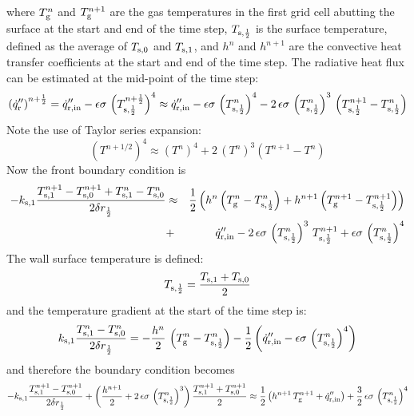 where $T_{\rm g}^n$ and $T_{\rm g}^{n+1}$ are the gas temperatures in the first grid cell abutting the surface at the start and end of the time step, $T_{\rm s,\frac{1}{2}}$ is the surface temperature, defined as the average of $T_{\rm s,0}$ and $T_{\rm s,1}$, and $h^n$ and $h^{n+1}$ are the convective heat transfer coefficients at the start and end of the time step. The radiative heat flux can be estimated at the mid-point of the time step:
\begin{equation}
\label{radi}
\left( \dot{q}_{\rm r}'' \right)^{n+\frac{1}{2}} = \dot{q}_{\rm r, in}'' - \epsilon \sigma \, \left( T_{\rm s,\frac{1}{2}}^{n+\frac{1}{2}} \right)^4
  \approx \dot{q}_{\rm r, in}'' - \epsilon \sigma \, \left( T_{\rm s,\frac{1}{2}}^n \right)^4 - 2 \, \epsilon\sigma \, \left( T_{\rm s,\frac{1}{2}}^n \right)^3 \, \left( T_{\rm s,\frac{1}{2}}^{n+1}-T_{\rm s,\frac{1}{2}}^n \right)
\end{equation}
Note the use of Taylor series expansion:
\begin{equation}
\label{T_taylor}
(T^{n+1/2})^4 \approx (T^n)^4 + 2 \, (T^n)^3 (T^{n+1}-T^n)
\end{equation}
Now the front boundary condition is
\begin{eqnarray}
\label{bc_front_2}
  -k_{\rm s,1} \frac{T_{\rm s,1}^{n+1}-T_{\rm s,0}^{n+1} + T_{\rm s,1}^{n}-T_{\rm s,0}^{n}}{2 \delta r_{\frac{1}{2}}}
  &\approx& \frac{1}{2} \left( h^n \left(T_{\rm g}^n - T_{\rm s,\frac{1}{2}}^n\right) + h^{n+1} \left(T_{\rm g}^{n+1} - T_{\rm s,\frac{1}{2}}^{n+1} \right) \right) \nonumber \\ &+&
  \dot{q}_{\rm r, in}'' - 2 \, \epsilon\sigma \, \left(T_{\rm s,\frac{1}{2}}^n \right)^3 \, T_{\rm s,\frac{1}{2}}^{n+1} +  \epsilon\sigma \, \left( T_{\rm s,\frac{1}{2}}^n \right)^4
\end{eqnarray}
The wall surface temperature is defined:
\begin{equation}
\label{T_front}
  T_{\rm s,\frac{1}{2}} = \frac{T_{\rm s,1}+T_{\rm s,0}}{2}
\end{equation}
and the temperature gradient at the start of the time step is:
\begin{equation}
k_{\rm s,1} \frac{T_{\rm s,1}^{n}-T_{\rm s,0}^{n}}{2 \delta r_{\frac{1}{2}}} = -\frac{h^n}{2} \, \left( T_{\rm g}^n - T_{\rm s,\frac{1}{2}}^n \right) - \frac{1}{2} \left( \dot{q}_{\rm r, in}'' - \epsilon \sigma \, \left( T_{\rm s,\frac{1}{2}}^{n} \right)^4 \right)
\end{equation}
and therefore the boundary condition becomes
\begin{equation}
\label{bc_front_4}
  -k_{\rm s,1} \frac{T_{\rm s,1}^{n+1}-T_{\rm s,0}^{n+1}}{2 \delta r_{\frac{1}{2}}} + \left( \frac{h^{n+1}}{2} + 2 \, \epsilon\sigma \, \left( T_{\rm s,\frac{1}{2}}^n \right)^3 \right) \frac{T_{\rm s,1}^{n+1}+T_{\rm s,0}^{n+1}}{2}
  \approx  \frac{1}{2} \left( h^{n+1} \, T_{\rm g}^{n+1} +
  \dot{q}_{\rm r, in}'' \right) + \frac{3}{2} \, \epsilon\sigma \, \left( T_{\rm s,\frac{1}{2}}^n \right)^4
\end{equation}
